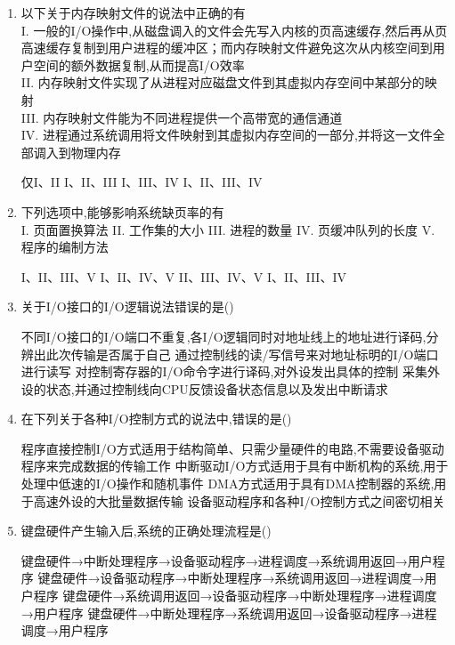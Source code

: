 \documentclass[12pt, a4paper, oneside, UTF8]{ctexbook}
\begin{document}
\begin{enumerate}
    \item 以下关于内存映射文件的说法中正确的有\\
    I. 一般的I/O操作中,从磁盘调入的文件会先写入内核的页高速缓存,然后再从页高速缓存复制到用户进程的缓冲区；而内存映射文件避免这次从内核空间到用户空间的额外数据复制,从而提高I/O效率\\
    II. 内存映射文件实现了从进程对应磁盘文件到其虚拟内存空间中某部分的映射\\
    III. 内存映射文件能为不同进程提供一个高带宽的通信通道\\
    IV. 进程通过系统调用将文件映射到其虚拟内存空间的一部分,并将这一文件全部调入到物理内存
    \begin{choices}[1]
    \task 仅I、II
    \task I、II、III
    \task I、III、IV
    \task I、II、III、IV
    \end{choices}

    \item 下列选项中,能够影响系统缺页率的有\\
    I. 页面置换算法\quad
    II. 工作集的大小\quad
    III. 进程的数量\quad
    IV. 页缓冲队列的长度\quad
    V. 程序的编制方法
    \begin{choices}[1]
    \task I、II、III、V
    \task I、II、IV、V
    \task II、III、IV、V
    \task I、II、III、IV
    \end{choices}

    \item 关于I/O接口的I/O逻辑说法错误的是(\qquad)
    \begin{choices}[1]
    \task 不同I/O接口的I/O端口不重复,各I/O逻辑同时对地址线上的地址进行译码,分辨出此次传输是否属于自己
    \task 通过控制线的读/写信号来对地址标明的I/O端口进行读写
    \task 对控制寄存器的I/O命令字进行译码,对外设发出具体的控制
    \task 采集外设的状态,并通过控制线向CPU反馈设备状态信息以及发出中断请求
    \end{choices}

    \item 在下列关于各种I/O控制方式的说法中,错误的是(\qquad)
    \begin{choices}[1]
    \task 程序直接控制I/O方式适用于结构简单、只需少量硬件的电路,不需要设备驱动程序来完成数据的传输工作
    \task 中断驱动I/O方式适用于具有中断机构的系统,用于处理中低速的I/O操作和随机事件
    \task DMA方式适用于具有DMA控制器的系统,用于高速外设的大批量数据传输
    \task 设备驱动程序和各种I/O控制方式之间密切相关
    \end{choices}

    \item 键盘硬件产生输入后,系统的正确处理流程是(\qquad)
    \begin{choices}[1]
    \task 键盘硬件→中断处理程序→设备驱动程序→进程调度→系统调用返回→用户程序
    \task 键盘硬件→设备驱动程序→中断处理程序→系统调用返回→进程调度→用户程序
    \task 键盘硬件→系统调用返回→设备驱动程序→中断处理程序→进程调度→用户程序
    \task 键盘硬件→中断处理程序→系统调用返回→设备驱动程序→进程调度→用户程序
    \end{choices}


\end{enumerate}
\end{document}
